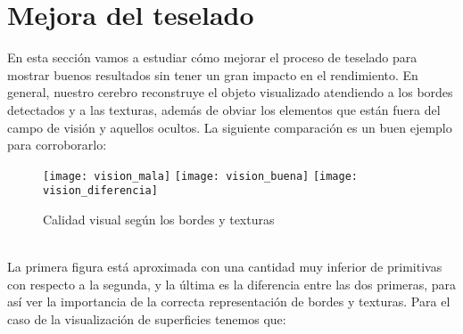 \section{Mejora del teselado}
	En esta sección vamos a estudiar cómo mejorar el proceso de teselado para mostrar buenos resultados sin tener un gran impacto en el rendimiento. En general, nuestro cerebro reconstruye el objeto visualizado atendiendo a los bordes detectados y a las texturas, además de obviar los elementos que están fuera del campo de visión y aquellos ocultos. La siguiente comparación es un buen ejemplo para corroborarlo:\\
	\begin{figure}[h]
  		\centering
  		\texttt{[image: vision\_mala]}
  		\texttt{[image: vision\_buena]}
  		\texttt{[image: vision\_diferencia]}
  		\caption{Calidad visual según los bordes y texturas}
  		\label{fig:vision_humana}
	\end{figure}
	\\La primera figura está aproximada con una cantidad muy inferior de primitivas con respecto a la segunda, y la última es la diferencia entre las dos primeras, para así ver la importancia de la correcta representación de bordes y texturas. Para el caso de la visualización de superficies tenemos que:
